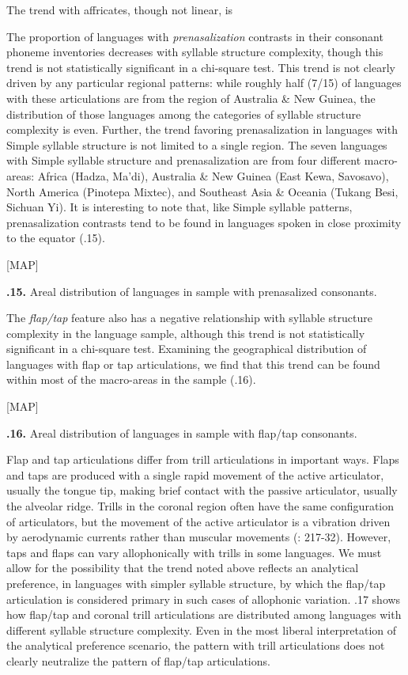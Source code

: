 The trend with affricates, though not linear, is 

  The proportion of languages with \textit{prenasalization} contrasts in their consonant phoneme inventories decreases with syllable structure complexity, though this trend is not statistically significant in a chi-square test. This trend is not clearly driven by any particular regional patterns: while roughly half (7/15) of languages with these articulations are from the region of Australia \& New Guinea, the distribution of those languages among the categories of syllable structure complexity is even. Further, the trend favoring prenasalization in languages with Simple syllable structure is not limited to a single region. The seven languages with Simple syllable structure and prenasalization are from four different macro-areas: Africa (Hadza, Ma’di), Australia \& New Guinea (East Kewa, Savosavo), North America (Pinotepa Mixtec), and Southeast Asia \& Oceania (Tukang Besi, Sichuan Yi). It is interesting to note that, like Simple syllable patterns, prenasalization contrasts tend to be found in languages spoken in close proximity to the equator (.15).

[MAP]

\textbf{.15.} Areal distribution of languages in sample with prenasalized consonants.

  The \textit{flap/tap} feature also has a negative relationship with syllable structure complexity in the language sample, although this trend is not statistically significant in a chi-square test. Examining the geographical distribution of languages with flap or tap articulations, we find that this trend can be found within most of the macro-areas in the sample (.16).

[MAP]

\textbf{.16.} Areal distribution of languages in sample with flap/tap consonants.

  Flap and tap articulations differ from trill articulations in important ways. Flaps and taps are produced with a single rapid movement of the active articulator, usually the tongue tip, making brief contact with the passive articulator, usually the alveolar ridge. Trills in the coronal region often have the same configuration of articulators, but the movement of the active articulator is a vibration driven by aerodynamic currents rather than muscular movements (\citealt{LadefogedMaddieson1996}: 217-32). However, taps and flaps can vary allophonically with trills in some languages. We must allow for the possibility that the trend noted above reflects an analytical preference, in languages with simpler syllable structure, by which the flap/tap articulation is considered primary in such cases of allophonic variation. .17 shows how flap/tap and coronal trill articulations are distributed among languages with different syllable structure complexity. Even in the most liberal interpretation of the analytical preference scenario, the pattern with trill articulations does not clearly neutralize the pattern of flap/tap articulations.

